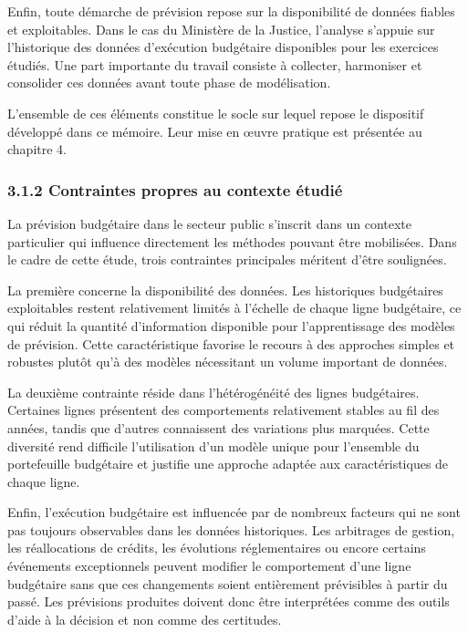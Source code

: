 Enfin, toute démarche de prévision repose sur la disponibilité de données fiables et exploitables. Dans le cas du Ministère de la Justice, l'analyse s'appuie sur l'historique des données d'exécution budgétaire disponibles pour les exercices étudiés. Une part importante du travail consiste à collecter, harmoniser et consolider ces données avant toute phase de modélisation.

L'ensemble de ces éléments constitue le socle sur lequel repose le dispositif développé dans ce mémoire. Leur mise en œuvre pratique est présentée au chapitre 4.

\bigskip

\subsubsection*{3.1.2 \quad Contraintes propres au contexte \'etudi\'e}

La pr\'evision budg\'etaire dans le secteur public s'inscrit dans un contexte
particulier qui influence directement les m\'ethodes pouvant \^etre
mobilis\'ees. Dans le cadre de cette \'etude, trois contraintes principales
m\'eritent d'\^etre soulign\'ees.

La premi\`ere concerne la disponibilit\'e des donn\'ees. Les historiques
budg\'etaires exploitables restent relativement limit\'es \`a l'\'echelle de
chaque ligne budg\'etaire, ce qui r\'eduit la quantit\'e d'information
disponible pour l'apprentissage des mod\`eles de pr\'evision. Cette
caract\'eristique favorise le recours \`a des approches simples et robustes
plut\^ot qu'\`a des mod\`eles n\'ecessitant un volume important de donn\'ees.

La deuxi\`eme contrainte r\'eside dans l'h\'et\'erog\'en\'eit\'e des lignes
budg\'etaires. Certaines lignes pr\'esentent des comportements relativement
stables au fil des ann\'ees, tandis que d'autres connaissent des variations
plus marqu\'ees. Cette diversit\'e rend difficile l'utilisation d'un mod\`ele
unique pour l'ensemble du portefeuille budg\'etaire et justifie une approche
adapt\'ee aux caract\'eristiques de chaque ligne.

Enfin, l'ex\'ecution budg\'etaire est influenc\'ee par de nombreux facteurs
qui ne sont pas toujours observables dans les donn\'ees historiques. Les
arbitrages de gestion, les r\'eallocations de cr\'edits, les \'evolutions
r\'eglementaires ou encore certains \'ev\'enements exceptionnels peuvent
modifier le comportement d'une ligne budg\'etaire sans que ces changements
soient enti\`erement pr\'evisibles \`a partir du pass\'e. Les pr\'evisions
produites doivent donc \^etre interpr\'et\'ees comme des outils d'aide \`a la
d\'ecision et non comme des certitudes.

